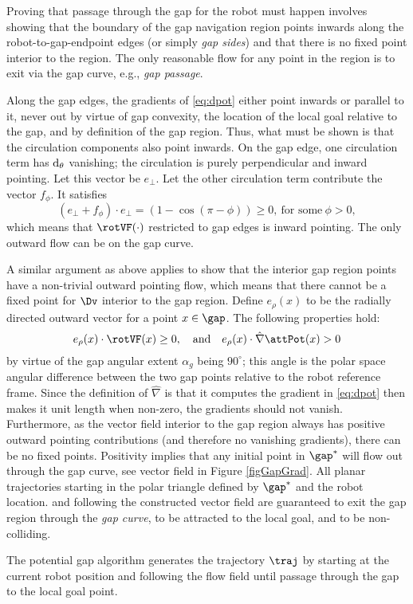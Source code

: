 Proving that passage through the gap for the robot must happen involves
showing that the boundary of the gap navigation region points inwards
along the robot-to-gap-endpoint edges (or simply {\em gap sides}) and
that there is no fixed point interior to the region.  The only
reasonable flow for any point in the region is to exit via the gap
curve, e.g., {\em gap passage}. 

Along the gap edges, the gradients of \eqref{eq:dpot} either point
inwards or parallel to it, never out by virtue of gap convexity, the
location of the local goal relative to the gap, and by definition of the
gap region. Thus, what must be shown is that the
circulation components also point inwards. On the gap edge, one
circulation term has $\operatorname{d}_\theta$ vanishing; the circulation is purely
perpendicular and inward pointing. Let this vector be $e_\perp$. Let the
other circulation term contribute the vector $f_\phi$. It satisfies
\begin{equation}
  (e_\perp + f_\phi)\cdot e_\perp = (1 - \cos(\pi - \phi)) \ge 0,
  \ \text{for some}\ \phi > 0,
\end{equation}
which means that $\rotVF(\cdot)$ restricted to gap edges is inward
pointing.  The only outward flow can be on the gap curve.

A similar argument as above applies to show that the interior gap region
points have a non-trivial outward pointing flow, which means that there
cannot be a fixed point for $\Dv$ interior to the gap region. 
Define $e_\rho(x)$ to be the radially directed outward vector for a
point $x \in \gap$. The following properties hold:
\begin{equation}
  e_\rho(x) \cdot \rotVF(x) \ge 0, \quad \text{and} \quad
  e_\rho(x) \cdot \hat \nabla \attPot(x) > 0
\end{equation}
by virtue of the gap angular extent $\alpha_g$ being $90^\circ$; this
angle is the polar space angular difference between the two gap points
relative to the robot reference frame. 
Since the definition of $\hat \nabla$ is that it computes the gradient in
\eqref{eq:dpot} then makes it unit length when non-zero, the gradients
should not vanish.  Furthermore, as the vector field interior to the gap
region always has positive outward pointing contributions
(and therefore no vanishing gradients), there can be no fixed points. 
Positivity implies that any initial point in $\gap^*$ will flow out
through the gap curve, see vector field in Figure \ref{figGapGrad}.  All
planar trajectories starting in the polar triangle defined by $\gap^*$ and
the robot location. and following the constructed vector field are
guaranteed to exit the gap region through the {\em gap curve}, to be
attracted to the local goal, and to be non-colliding. 

The potential gap algorithm generates the trajectory $\traj$ by starting
at the current robot position and following the flow field until passage
through the gap to the local goal point.
